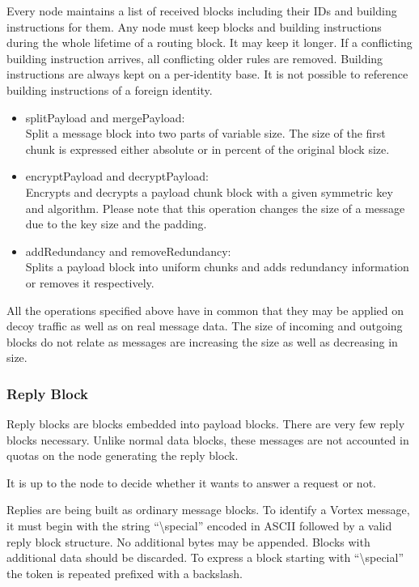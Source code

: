 Every node maintains a list of received blocks including their IDs and building instructions for them. Any node must keep blocks and building instructions during the whole lifetime of a routing block. It may keep it longer. If a conflicting building instruction arrives, all conflicting older rules are removed. Building instructions are always kept on a per-identity base. It is not possible to reference building instructions of a foreign identity.

\begin{itemize}
	\item splitPayload and mergePayload: \\
	Split a message block into two parts of variable size. The size of the first chunk is expressed either absolute or in percent of the original block size.
	\item encryptPayload and decryptPayload:\\ 
	Encrypts and decrypts a payload chunk block with a given symmetric key and algorithm. Please note that this operation changes the size of a message due to the key size and the padding.
	\item addRedundancy and removeRedundancy:\\
	Splits a payload block into uniform chunks and adds redundancy information or removes it respectively.
\end{itemize}
All the operations specified above have in common that they may be applied on decoy traffic as well as on real message data. The size of incoming and outgoing blocks do not relate as messages are increasing the size as well as decreasing in size.

\subsubsection{Reply Block\label{sec:replyBlock}}
Reply blocks are blocks embedded into payload blocks. There are very few reply blocks necessary. Unlike normal data blocks, these messages are not accounted in quotas on the node generating the reply block. 

It is up to the node to decide whether it wants to answer a request or not.

Replies are being built as ordinary message blocks. To identify a Vortex message, it must begin with the string ``\textbackslash special'' encoded in ASCII followed by a valid reply block structure. No additional bytes may be appended. Blocks with additional data should be discarded. To express a block starting with ``\textbackslash special'' the token is repeated prefixed with a backslash.

